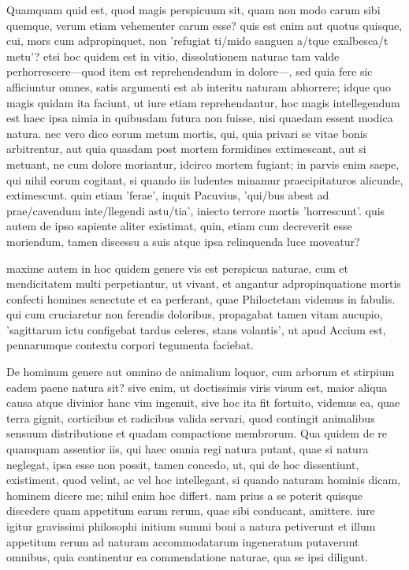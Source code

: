  Quamquam quid est, quod magis perspicuum sit, quam non modo carum sibi quemque, verum etiam vehementer carum esse? quis est enim aut quotus quisque, cui, mors cum adpropinquet, non 'refugiat ti/mido sanguen a/tque exalbesca/t metu'? etsi hoc quidem est in vitio, dissolutionem naturae tam valde perhorrescere—quod item est reprehendendum in dolore—, sed quia fere sic afficiuntur omnes, satis argumenti est ab interitu naturam abhorrere; idque quo magis quidam ita faciunt, ut iure etiam reprehendantur, hoc magis intellegendum est haec ipsa nimia in quibusdam futura non fuisse, nisi quaedam essent modica natura. nec vero dico eorum metum mortis, qui, quia privari se vitae bonis arbitrentur, aut quia quasdam post mortem formidines extimescant, aut si metuant, ne cum dolore moriantur, idcirco mortem fugiant; in parvis enim saepe, qui nihil eorum cogitant, si quando iis ludentes minamur praecipitaturos alicunde, extimescunt. quin etiam 'ferae', inquit Pacuvius, 'qui/bus abest ad prae/cavendum inte/llegendi astu/tia', iniecto terrore mortis 'horrescunt'. quis autem de ipso sapiente aliter existimat, quin, etiam cum decreverit esse moriendum, tamen discessu a suis atque ipsa relinquenda luce moveatur?

 maxime autem in hoc quidem genere vis est perspicua naturae, cum et mendicitatem multi perpetiantur, ut vivant, et angantur adpropinquatione mortis confecti homines senectute et ea perferant, quae Philoctetam videmus in fabulis. qui cum cruciaretur non ferendis doloribus, propagabat tamen vitam aucupio, 'sagittarum ictu configebat tardus celeres, stans volantis', ut apud Accium est, pennarumque contextu corpori tegumenta faciebat.

 De hominum genere aut omnino de animalium loquor, cum arborum et stirpium eadem paene natura sit? sive enim, ut doctissimis viris visum est, maior aliqua causa atque divinior hanc vim ingenuit, sive hoc ita fit fortuito, videmus ea, quae terra gignit, corticibus et radicibus valida servari, quod contingit animalibus sensuum distributione et quadam compactione membrorum. Qua quidem de re quamquam assentior iis, qui haec omnia regi natura putant, quae si natura neglegat, ipsa esse non possit, tamen concedo, ut, qui de hoc dissentiunt, existiment, quod velint, ac vel hoc intellegant, si quando naturam hominis dicam, hominem dicere me; nihil enim hoc differt. nam prius a se poterit quisque discedere quam appetitum earum rerum, quae sibi conducant, amittere. iure igitur gravissimi philosophi initium summi boni a natura petiverunt et illum appetitum rerum ad naturam accommodatarum ingeneratum putaverunt omnibus, quia continentur ea commendatione naturae, qua se ipsi diligunt.

